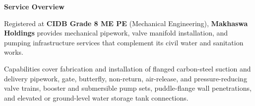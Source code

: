 \documentclass[a4paper,11pt]{article}
\begin{document}
\noindent
\begin{minipage}[t]{0.63\textwidth}
    \vspace{0pt}
    {\large\bfseries\color{mhnavy} Service Overview}
    \vspace{0.08cm}

    {\fontsize{8.7pt}{12.3pt}\selectfont\color{mhtext}
    Registered at \textbf{CIDB Grade 8 ME PE} (Mechanical Engineering), \textbf{Makhaswa Holdings} provides mechanical pipework, valve manifold installation, and pumping infrastructure services that complement its civil water and sanitation works.
    }

    \vspace{0.15cm}

    {\fontsize{8.7pt}{12.3pt}\selectfont\color{mhtext}
    Capabilities cover fabrication and installation of flanged carbon-steel suction and delivery pipework, gate, butterfly, non-return, air-release, and pressure-reducing valve trains, booster and submersible pump sets, puddle-flange wall penetrations, and elevated or ground-level water storage tank connections.
    }
\end{minipage}
\hfill
\end{document}
